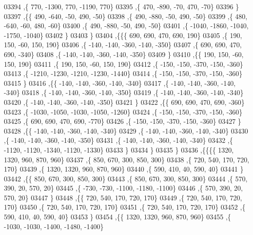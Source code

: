 \begin{DoxyCode}
03394     ,\{   770, -1300,   770, -1190,   770\}
03395     ,\{   470,  -890,   -70,   470,   -70\}
03396     \}
03397    ,\{\{   490,  -640,   -50,   490,   -50\}
03398     ,\{   490,  -880,   -50,   490,   -50\}
03399     ,\{   480,  -640,   -60,   480,   -60\}
03400     ,\{   490,  -880,   -50,   490,   -50\}
03401     ,\{ -1040, -1860, -1040, -1750, -1040\}
03402     \}
03403    \}
03404   ,\{\{\{   690,   690,   470,   690,   190\}
03405     ,\{   190,   150,   -60,   150,   190\}
03406     ,\{  -140,  -140,  -360,  -140,  -350\}
03407     ,\{   690,   690,   470,   690,  -340\}
03408     ,\{  -140,  -140,  -360,  -140,  -350\}
03409     \}
03410    ,\{\{   190,   150,   -60,   150,   190\}
03411     ,\{   190,   150,   -60,   150,   190\}
03412     ,\{  -150,  -150,  -370,  -150,  -360\}
03413     ,\{ -1210, -1230, -1210, -1230, -1440\}
03414     ,\{  -150,  -150,  -370,  -150,  -360\}
03415     \}
03416    ,\{\{  -140,  -140,  -360,  -140,  -340\}
03417     ,\{  -140,  -140,  -360,  -140,  -340\}
03418     ,\{  -140,  -140,  -360,  -140,  -350\}
03419     ,\{  -140,  -140,  -360,  -140,  -340\}
03420     ,\{  -140,  -140,  -360,  -140,  -350\}
03421     \}
03422    ,\{\{   690,   690,   470,   690,  -360\}
03423     ,\{ -1030, -1050, -1030, -1050, -1260\}
03424     ,\{  -150,  -150,  -370,  -150,  -360\}
03425     ,\{   690,   690,   470,   690,  -770\}
03426     ,\{  -150,  -150,  -370,  -150,  -360\}
03427     \}
03428    ,\{\{  -140,  -140,  -360,  -140,  -340\}
03429     ,\{  -140,  -140,  -360,  -140,  -340\}
03430     ,\{  -140,  -140,  -360,  -140,  -350\}
03431     ,\{  -140,  -140,  -360,  -140,  -340\}
03432     ,\{ -1120, -1120, -1340, -1120, -1330\}
03433     \}
03434    \}
03435   \}
03436  ,\{\{\{\{  1320,  1320,   960,   870,   960\}
03437     ,\{   850,   670,   300,   850,   300\}
03438     ,\{   720,   540,   170,   720,   170\}
03439     ,\{  1320,  1320,   960,   870,   960\}
03440     ,\{   590,   410,    40,   590,    40\}
03441     \}
03442    ,\{\{   850,   670,   300,   850,   300\}
03443     ,\{   850,   670,   300,   850,   300\}
03444     ,\{   570,   390,    20,   570,    20\}
03445     ,\{  -730,  -730, -1100, -1180, -1100\}
03446     ,\{   570,   390,    20,   570,    20\}
03447     \}
03448    ,\{\{   720,   540,   170,   720,   170\}
03449     ,\{   720,   540,   170,   720,   170\}
03450     ,\{   720,   540,   170,   720,   170\}
03451     ,\{   720,   540,   170,   720,   170\}
03452     ,\{   590,   410,    40,   590,    40\}
03453     \}
03454    ,\{\{  1320,  1320,   960,   870,   960\}
03455     ,\{ -1030, -1030, -1400, -1480, -1400\}

\end{DoxyCode}
